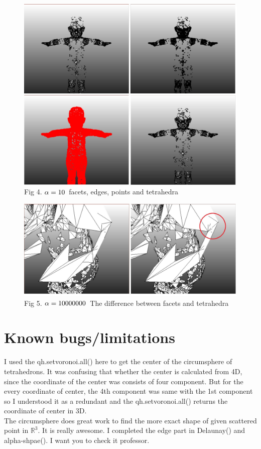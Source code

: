 \documentclass[11pt]{article}
\begin{document}
\begin{figure}[h]
  \includegraphics[width=120mm]{bb 10.jpg}\\
  Fig 4. $\alpha=10\hspace{0.15cm}$facets, edges, points and tetrahedra
\end{figure}

\begin{figure}[h]
  \includegraphics[width=140mm]{differece_btw_facetAndtetra.jpg}\\
  Fig 5. $\alpha=10000000 \hspace{0.15cm}$The difference between facets and tetrahedra
\end{figure}



\section{Known bugs/limitations}
I used the qh.setvoronoi.all() here to get the center of the circumsphere of tetrahedrons. It was confusing that whether the center is calculated from 4D, since the coordinate of the center was consists of four component. But for the every coordinate of center, the 4th component was same with the 1st component so I understood it as a redundant and the qh.setvoronoi.all() returns the coordinate of center in 3D.\\
The circumsphere does great work to find the more exact shape of given scattered point in $\mathbb{R}^3$. It is really awesome.
I completed the edge part in Delaunay() and alpha-shpae(). I want you to check it professor.  



\end{document}
